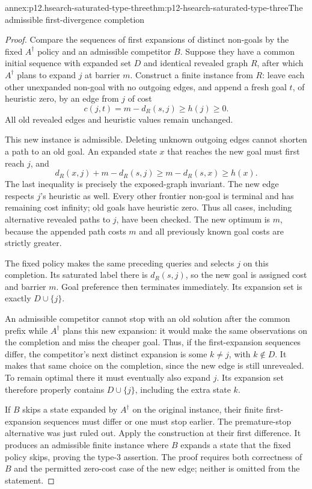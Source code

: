 \begin{annexitem}{annex:p12.hsearch-saturated-type-three}{thm:p12-hsearch-saturated-type-three}{The admissible first-divergence completion}
\begin{proof}
Compare the sequences of first expansions of distinct non-goals by the
fixed \(A^\dagger\) policy and an admissible competitor \(B\).
Suppose they have a common initial sequence with expanded set \(D\)
and identical revealed graph \(R\), after which \(A^\dagger\)
plans to expand \(j\) at barrier \(m\). Construct a finite
instance from \(R\): leave each other unexpanded non-goal with no
outgoing edges, and append a fresh goal \(t\), of heuristic zero,
by an edge from \(j\) of cost
\[
                         c(j,t)=m-d_R(s,j)\ge h(j)\ge 0.
\]
All old revealed edges and heuristic values remain unchanged.

This new instance is admissible. Deleting unknown outgoing edges cannot
shorten a path to an old goal. An expanded state \(x\) that reaches
the new goal must first reach \(j\), and
\[
 d_R(x,j)+m-d_R(s,j)\ge m-d_R(s,x)\ge h(x).
\]
The last inequality is precisely the exposed-graph invariant. The new
edge respects \(j\)'s heuristic as well. Every other frontier
non-goal is terminal and has remaining cost infinity; old goals have
heuristic zero. Thus all cases, including alternative revealed paths to
\(j\), have been checked. The new optimum is \(m\), because
the appended path costs \(m\) and all previously known goal costs
are strictly greater.

The fixed policy makes the same preceding queries and selects \(j\)
on this completion. Its saturated label there is \(d_R(s,j)\),
so the new goal is assigned cost and barrier \(m\). Goal preference
then terminates immediately. Its expansion set is exactly
\(D\cup\{j\}\).

An admissible competitor cannot stop with an old solution after the
common prefix while \(A^\dagger\) plans this new expansion: it
would make the same observations on the completion and miss the cheaper
goal. Thus, if the first-expansion sequences differ, the competitor's
next distinct expansion is some \(k\ne j\), with \(k\notin D\).
It makes that same choice on the completion, since the new edge is still
unrevealed. To remain optimal there it must eventually also expand
\(j\). Its expansion set therefore properly contains
\(D\cup\{j\}\), including the extra state \(k\).

If \(B\) skips a state expanded by \(A^\dagger\) on the
original instance, their finite first-expansion sequences must differ
or one must stop earlier. The premature-stop alternative was just ruled
out. Apply the construction at their first difference. It produces an
admissible finite instance where \(B\) expands a state that the fixed
policy skips, proving the type-3 assertion. The proof requires both
correctness of \(B\) and the permitted zero-cost case of the new
edge; neither is omitted from the statement.
\end{proof}
\end{annexitem}

